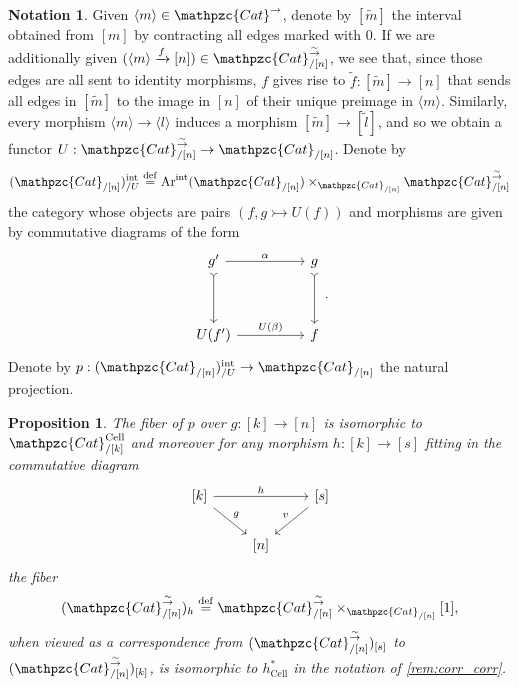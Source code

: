 \documentclass[a4paper, reqno]{amsart}
\newtheorem{prop}[theorem]{Proposition}
\theoremstyle{definition}
\newtheorem{notation}[theorem]{Notation}
\newcommand\ccat{\mathpzc{Cat}}
\newcommand\arr{\mathrm{Ar}}
\newcommand\bydef{\overset{\mathrm{def}}{=}}
\newcommand\cell{\mathrm{Cell}}
\newcommand\bm{\langle m\rangle}
\newcommand\bl{\langle l\rangle}
\newcommand\wrr{{\overset{\sim}{\rightarrow}}}
\newcommand\inrt{\mathrm{int}}
\begin{document}
\begin{notation}\label{not:forget}
Given $\bm\in\ccat^\rightarrow$, denote by $[\widetilde{m}]$ the interval obtained from $[m]$ by contracting all edges marked with $0$. If we are additionally given $(\bm\xrightarrow{f}[n])\in\ccat^\wrr_{/[n]}$, we see that, since those edges are all sent to identity morphisms, $f$ gives rise to $\widetilde{f}:[\widetilde{m}]\rightarrow[n]$ that sends all edges in $[\widetilde{m}]$ to the image in $[n]$ of their unique preimage in $\bm$. Similarly, every morphism $\bm\rightarrow\bl$ induces a morphism $[\widetilde{m}]\rightarrow[\widetilde{l}]$, and so we obtain a functor $U:\ccat^\wrr_{/[n]}\rightarrow\ccat_{/[n]}$. Denote by \[(\ccat_{/[n]})^\inrt_{/U}\bydef \arr^\inrt(\ccat_{/[n]})\times_{\ccat_{/[n]}}\ccat^\wrr_{/[n]}\]
the category whose objects are pairs $(f,g\rightarrowtail U(f))$ and morphisms are given by commutative diagrams of the form 
\[
\begin{tikzcd}[row sep=huge, column sep=huge]
g'\arrow[d,tail]\arrow[r, "\alpha"]&g\arrow[d, tail]\\
U(f')\arrow[r, "U(\beta)"]&f
\end{tikzcd}.
\] Denote by $p:(\ccat_{/[n]})^\inrt_{/U}\rightarrow\ccat_{/[n]}$ the natural projection.
\end{notation}
\begin{prop}\label{prop:forget}
The fiber of $p$ over $g:[k]\rightarrow[n]$ is isomorphic to $\ccat^\cell_{/[k]}$ and moreover for any morphism $h:[k]\rightarrow[s]$ fitting in the commutative diagram
\[
\begin{tikzcd}
{[k]}\arrow[rr, "h"]\arrow[rd, "g"]&{}&{[s]}\arrow[ld, "v" swap]\\
{}&{[n]}
\end{tikzcd}
\]
the fiber 
\[(\ccat^\wrr_{/[n]})_h\bydef\ccat^\wrr_{/[n]}\times_{\ccat_{/[n]}}[1],\] 
when viewed as a correspondence from $(\ccat^\wrr_{/[n]})_{[s]}$ to $(\ccat^\wrr_{/[n]})_{[k]}$, is isomorphic to $h^*_\cell$ in the notation of \cref{rem:corr_corr}.
\end{prop}
\end{document}
